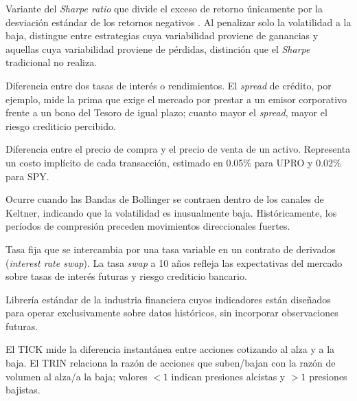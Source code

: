 \begin{description}[style=nextline, leftmargin=1.5cm]
\item[\hypertarget{glos:sortino_ratio}{\textit{Sortino Ratio}}]
Variante del \textit{Sharpe ratio} que divide el exceso de retorno \'unicamente por la desviaci\'on est\'andar de los retornos negativos \citep{sortino1991}. Al penalizar solo la volatilidad a la baja, distingue entre estrategias cuya variabilidad proviene de ganancias y aquellas cuya variabilidad proviene de p\'erdidas, distinci\'on que el \textit{Sharpe} tradicional no realiza.

\item[\hypertarget{glos:spread}{\textit{Spread} (diferencial)}]
Diferencia entre dos tasas de inter\'es o rendimientos. El \textit{spread} de cr\'edito, por ejemplo, mide la prima que exige el mercado por prestar a un emisor corporativo frente a un bono del Tesoro de igual plazo; cuanto mayor el \textit{spread}, mayor el riesgo crediticio percibido.

\item[\hypertarget{glos:spread_bidask}{\textit{Spread bid-ask}}]
Diferencia entre el precio de compra y el precio de venta de un activo. Representa un costo impl\'icito de cada transacci\'on, estimado en 0.05\% para UPRO y 0.02\% para SPY.

\item[\hypertarget{glos:squeeze}{\textit{Squeeze} (compresi\'on)}]
Ocurre cuando las Bandas de Bollinger se contraen dentro de los canales de Keltner, indicando que la volatilidad es inusualmente baja. Hist\'oricamente, los per\'iodos de compresi\'on preceden movimientos direccionales fuertes.

\item[\hypertarget{glos:swap}{Tasa \textit{swap} de inter\'es}]
Tasa fija que se intercambia por una tasa variable en un contrato de derivados (\textit{interest rate swap}). La tasa \textit{swap} a 10 a\~nos refleja las expectativas del mercado sobre tasas de inter\'es futuras y riesgo crediticio bancario.

\item[\hypertarget{glos:talib}{TA-Lib (\textit{Technical Analysis Library})}]
Librer\'ia est\'andar de la industria financiera cuyos indicadores est\'an dise\~nados para operar exclusivamente sobre datos hist\'oricos, sin incorporar observaciones futuras.

\item[\hypertarget{glos:tick_trin}{TICK / TRIN (\textit{Arms Index})}]
El TICK mide la diferencia instant\'anea entre acciones cotizando al alza y a la baja. El TRIN relaciona la raz\'on de acciones que suben/bajan con la raz\'on de volumen al alza/a la baja; valores $<1$ indican presiones alcistas y $>1$ presiones bajistas.


\end{description}
